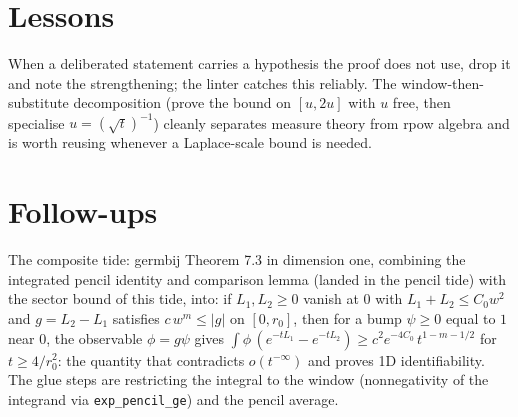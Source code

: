 \documentclass[11pt]{article}
\begin{document}
\section{Lessons}

When a deliberated statement carries a hypothesis the proof does not use,
drop it and note the strengthening; the linter catches this reliably. The
window-then-substitute decomposition (prove the bound on $[u, 2u]$ with $u$
free, then specialise $u = (\sqrt t)^{-1}$) cleanly separates measure theory
from rpow algebra and is worth reusing whenever a Laplace-scale bound is
needed.

\section{Follow-ups}

The composite tide: germbij Theorem 7.3 in dimension one, combining the
integrated pencil identity and comparison lemma (landed in the pencil
tide) with the sector bound of this tide, into: if $L_1, L_2
\geq 0$ vanish at $0$ with $L_1 + L_2 \leq C_0 w^2$ and $g = L_2 - L_1$
satisfies $c\, w^m \leq |g|$ on $[0, r_0]$, then for a bump $\psi \geq 0$
equal to $1$ near $0$, the observable $\phi = g \psi$ gives
$\int \phi\,(e^{-tL_1} - e^{-tL_2}) \geq c^2 e^{-4C_0}\, t^{1 - m - 1/2}$ for
$t \geq 4/r_0^2$: the quantity that contradicts $o(t^{-\infty})$ and proves
1D identifiability. The glue steps are restricting the integral to the
window (nonnegativity of the integrand via \texttt{exp\_pencil\_ge}) and the
pencil average.
\end{document}
